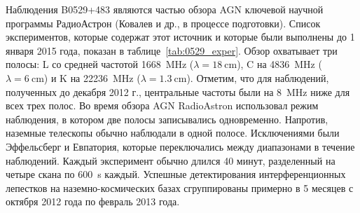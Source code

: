 Наблюдения B0529+483 являются частью обзора AGN ключевой научной программы РадиоАстрон (Ковалев и
др., в процессе подготовки). Список экспериментов, которые содержат этот источник и которые были
выполнены до 1 января 2015 года, показан в таблице~\ref{tab:0529_exper}. Обзор охватывает три
полосы: L со средней частотой \SI{1668}{\MHz} ($\lambda = \SI{18}{\cm}$), C на \SI{4836}{\MHz}
($\lambda = \SI{6}{\cm}$) и K на \SI{22236}{\MHz} ($\lambda = \SI{1.3}{\cm}$). Отметим, что для
наблюдений, полученных до декабря 2012 г., центральные частоты были на \SI{8}{\MHz} ниже для всех
трех полос. Во время обзора AGN RadioAstron использовал режим наблюдения, в котором две полосы
записывались одновременно. Напротив, наземные телескопы обычно наблюдали в одной полосе.
Исключениями были Эффельсберг и Евпатория, которые переключались между диапазонами в течение
наблюдений. Каждый эксперимент обычно длился 40 минут, разделенный на четыре скана по
\SI{600}{\second} каждый. Успешные детектирования интерференционных лепестков  на
наземно-космических базах сгруппированы примерно в 5 месяцев с октября 2012 года по февраль 2013
года.

